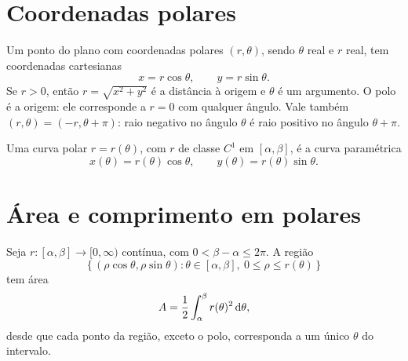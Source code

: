 \documentclass[11pt,a4paper]{article}
\begin{document}
\section{Coordenadas polares}

\begin{definicao}
Um ponto do plano com coordenadas polares \((r,\theta)\), sendo \(\theta\) real e \(r\) real, tem coordenadas cartesianas
\[
x=r\cos\theta,\qquad y=r\sin\theta.
\]
Se \(r>0\), então \(r=\sqrt{x^{2}+y^{2}}\) é a distância à origem e \(\theta\) é um argumento. O polo é a origem: ele corresponde a \(r=0\) com qualquer ângulo. Vale também \((r,\theta)=(-r,\theta+\pi)\): raio negativo no ângulo \(\theta\) é raio positivo no ângulo \(\theta+\pi\).
\end{definicao}

Uma curva polar \(r=r(\theta)\), com \(r\) de classe \(C^1\) em \([\alpha,\beta]\), é a curva paramétrica
\[
x(\theta)=r(\theta)\cos\theta,\qquad y(\theta)=r(\theta)\sin\theta.
\]


\section{Área e comprimento em polares}

\begin{teorema}[Área]
Seja \(r:[\alpha,\beta]\to[0,\infty)\) contínua, com \(0<\beta-\alpha\le 2\pi\). A região
\[
\bigl\{\,(\rho\cos\theta,\rho\sin\theta): \theta\in[\alpha,\beta],\ 0\le\rho\le r(\theta)\,\bigr\}
\]
tem área
\begin{equation}
A=\frac12\int_{\alpha}^{\beta} r(\theta)^{2}\,\mathrm{d}\theta,
\label{eq:area-polar}
\end{equation}
desde que cada ponto da região, exceto o polo, corresponda a um único \(\theta\) do intervalo.
\end{teorema}
\end{document}
